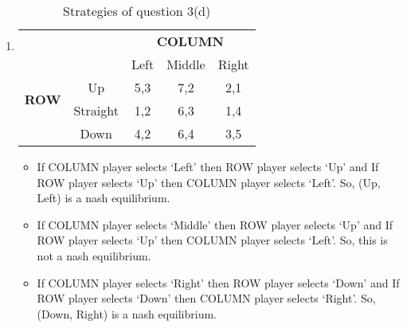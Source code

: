 \documentclass[a4paper,12pt]{article}
\begin{document}
\begin{enumerate}
\begin{enumerate}
\item
\begin{table}[H]
\centering
\begin{tabular}{@{}ccccc@{}}
\toprule
\multicolumn{2}{c}{} & \multicolumn{3}{c}{\bfseries COLUMN}\\
\multicolumn{2}{c}{} & Left & Middle & Right\\
\multirow{2}{*}{\bfseries ROW} & Up & 5,3 & 7,2 & 2,1\\
 & Straight & 1,2 & 6,3 & 1,4\\
 & Down & 4,2 & 6,4 & 3,5\\
 \bottomrule
\end{tabular}
\caption{Strategies of question 3(d)}
\end{table}
\begin{itemize}
\item
If COLUMN player selects `Left' then ROW player selects `Up' and If ROW player selects `Up' then COLUMN player selects `Left'. So, (Up, Left) is a nash equilibrium.
\item
If COLUMN player selects `Middle' then ROW player selects `Up' and If ROW player selects `Up' then COLUMN player selects `Left'. So, this is not a nash equilibrium.
\item
If COLUMN player selects `Right' then ROW player selects `Down' and If ROW player selects `Down' then COLUMN player selects `Right'. So, (Down, Right) is a nash equilibrium.
\end{itemize}
\end{enumerate}


\end{enumerate}
\end{document}
